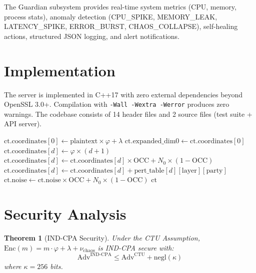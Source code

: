 \documentclass[11pt,a4paper]{article}
\newtheorem{theorem}{Theorem}[section]
\begin{document}
The Guardian subsystem provides real-time system metrics (CPU, memory, process stats), anomaly detection (CPU\_SPIKE, MEMORY\_LEAK, LATENCY\_SPIKE, ERROR\_BURST, CHAOS\_COLLAPSE), self-healing actions, structured JSON logging, and alert notifications.

\section{Implementation}

The server is implemented in C++17 with zero external dependencies beyond OpenSSL 3.0+. Compilation with \texttt{-Wall -Wextra -Werror} produces zero warnings. The codebase consists of 14 header files and 2 source files (test suite + API server).

\begin{algorithm}
\caption{Encryption (7D Banach Forward Pass)}
\begin{algorithmic}[1]
\State $\text{ct.coordinates}[0] \gets \text{plaintext} \times \varphi + \lambda$
\State $\text{ct.expanded\_dim0} \gets \text{ct.coordinates}[0]$ 
    \State $\text{ct.coordinates}[d] \gets \varphi \times (d+1)$
\EndFor
{}
        \State $\text{ct.coordinates}[d] \gets \text{ct.coordinates}[d] \times \text{OCC} + N_0 \times (1 - \text{OCC})$
        \State $\text{ct.coordinates}[d] \gets \text{ct.coordinates}[d] + \text{pert\_table}[d][\text{layer}][\text{party}]$
    \EndFor
    \State $\text{ct.noise} \gets \text{ct.noise} \times \text{OCC} + N_0 \times (1 - \text{OCC})$
\EndFor
\State \Return $\text{ct}$
\end{algorithmic}
\end{algorithm}

\section{Security Analysis}

\begin{theorem}[IND-CPA Security]
Under the CTU Assumption, $\text{Enc}(m) = m \cdot \varphi + \lambda + \nu_{\text{chaos}}$ is IND-CPA secure with:
\begin{equation}
    \text{Adv}^{\text{IND-CPA}} \leq \text{Adv}^{\text{CTU}} + \text{negl}(\kappa)
\end{equation}
where $\kappa = 256$ bits.
\end{theorem}
\end{document}
